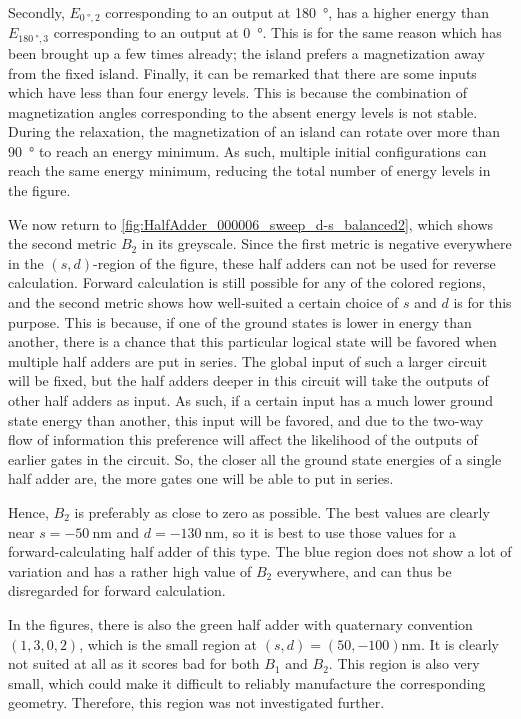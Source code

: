 \documentclass[11pt,a4paper,english,twoside]{article}
\begin{document}
Secondly, $E_{\SI{0}{\degree}, 2}$ corresponding to an output at \SI{180}{\degree}, has a higher energy than $E_{\SI{180}{\degree}, 3}$ corresponding to an output at \SI{0}{\degree}. This is for the same reason which has been brought up a few times already; the island prefers a magnetization away from the fixed island.
Finally, it can be remarked that there are some inputs which have less than four energy levels. This is because the combination of magnetization angles corresponding to the absent energy levels is not stable. During the relaxation, the magnetization of an island can rotate over more than \SI{90}{\degree} to reach an energy minimum. As such, multiple initial configurations can reach the same energy minimum, reducing the total number of energy levels in the figure. \par

We now return to \cref{fig:HalfAdder_000006_sweep_d-s_balanced2}, which shows the second metric $B_2$ in its greyscale. Since the first metric is negative everywhere in the $(s,d)$-region of the figure, these half adders can not be used for reverse calculation. Forward calculation is still possible for any of the colored regions, and the second metric shows how well-suited a certain choice of $s$ and $d$ is for this purpose. This is because, if one of the ground states is lower in energy than another, there is a chance that this particular logical state will be favored when multiple half adders are put in series. The global input of such a larger circuit will be fixed, but the half adders deeper in this circuit will take the outputs of other half adders as input. As such, if a certain input has a much lower ground state energy than another, this input will be favored, and due to the two-way flow of information this preference will affect the likelihood of the outputs of earlier gates in the circuit. So, the closer all the ground state energies of a single half adder are, the more gates one will be able to put in series. \par
Hence, $B_2$ is preferably as close to zero as possible. The best values are clearly near $s=\SI{-50}{\nano\metre}$ and $d=\SI{-130}{\nano\metre}$, so it is best to use those values for a forward-calculating half adder of this type. The blue region does not show a lot of variation and has a rather high value of $B_2$ everywhere, and can thus be disregarded for forward calculation.

In the figures, there is also the green half adder with quaternary convention $(1,3,0,2)$, which is the small region at $(s,d) = (50, -100) \si{\nano\metre}$. It is clearly not suited at all as it scores bad for both $B_1$ and $B_2$. This region is also very small, which could make it difficult to reliably manufacture the corresponding geometry. Therefore, this region was not investigated further.
\end{document}
